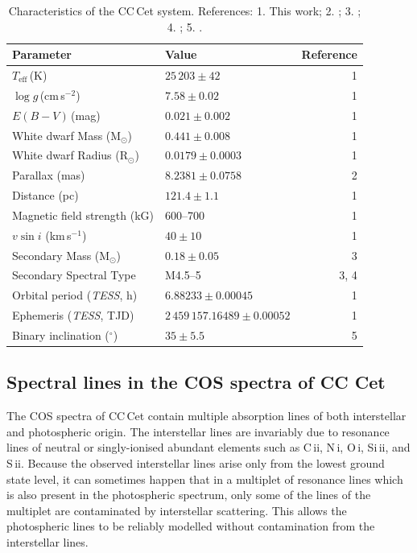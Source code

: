 \documentclass[fleqn,usenatbib]{mnras}
\newcommand{\Msun}{\mbox{$\mathrm{M}_{\odot}$}}
\newcommand{\Rsun}{\mbox{$\mathrm{R}_{\odot}$}}
\begin{document}
\begin{table} 
\setlength{\tabcolsep}{4pt} %
\centering 
\caption{Characteristics of the CC\,Cet system. 
References: 1. This work; 2. \citet{gaia18-1}; 3. \citet{safferetal93-1}; 4. \citet{tappertetal07-2}; 5. \citet{somersetal96-2}.}
\begin{tabular}{llr}
\hline
Parameter & Value & Reference \\
\hline 
$T_{\mathrm{eff}}$\,(K)           & $25\,203\pm42$              & 1\\
$\log g$\,(cm\,s$^{-2}$)          &  $7.58\pm0.02$            & 1\\
$E(B-V)$\,(mag)                   & $0.021\pm0.002$           & 1\\
White dwarf Mass (\Msun)          & $0.441\pm0.008$           & 1\\
White dwarf Radius (\Rsun)        & $0.0179\pm0.0003$         & 1\\
Parallax (mas)                    & $8.2381\pm0.0758$         & 2 \\
Distance (pc)                     & $121.4\pm1.1$             & 1\\
Magnetic field strength (kG)      & 600--700                  & 1 \\
$v \sin i$ (km\,s$^{-1}$)         & $40\pm10$                 & 1\\
Secondary Mass (\Msun)            & $0.18\pm0.05$             & 3\\
Secondary Spectral Type           & M4.5--5                   & 3, 4 \\ 
Orbital period (\textit{TESS}, h) & $6.88233\pm0.00045$        & 1\\
Ephemeris (\textit{TESS}, TJD)   & $2\,459\,157.16489\pm0.00052$ & 1 \\
Binary inclination ($^{\circ}$)   & $35\pm5.5$                & 5 \\

\hline
\end{tabular} 
\label{tab:characteristics} 
\end{table} 

\subsection{Spectral lines in the COS spectra of CC Cet}

The COS spectra of CC\,Cet contain multiple absorption lines of both interstellar and photospheric origin. The interstellar lines are invariably due to resonance lines of neutral or singly-ionised abundant elements such as C\,{\sc ii}, N\,{\sc i}, O\,{\sc i}, Si\,{\sc ii}, and S\,{\sc ii}. Because the observed interstellar lines arise only from the lowest ground state level, it can sometimes happen that in a multiplet of resonance lines which is also present in the photospheric spectrum, only some of the lines of the multiplet are contaminated by interstellar scattering. This allows the photospheric lines to be reliably modelled without contamination from the interstellar lines. 
\end{document}
